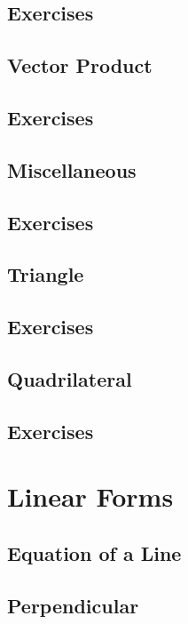 \documentclass[11pt]{book}
\begin{document}
\section{Exercises}

\section{Vector Product}

\section{Exercises}

\section{Miscellaneous}

\section{Exercises}

\section{Triangle}

\section{Exercises}

\section{ Quadrilateral}

\section{Exercises}

\else
\chapter{Linear Forms}
\section{Equation of a Line}

\section{Perpendicular}

\end{document}
